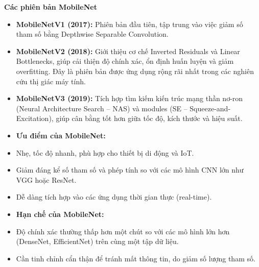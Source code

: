\documentclass[
]{article}
\begin{document}
\textbf{Các phiên bản MobileNet}

\begin{itemize}
\item
  \textbf{MobileNetV1 (2017):} Phiên bản đầu tiên, tập trung vào việc
  giảm số tham số bằng Depthwise Separable Convolution.
\item
  \textbf{MobileNetV2 (2018):} Giới thiệu cơ chế Inverted Residuals và
  Linear Bottlenecks, giúp cải thiện độ chính xác, ổn định huấn luyện và
  giảm overfitting. Đây là phiên bản được ứng dụng rộng rãi nhất trong
  các nghiên cứu thị giác máy tính.
\item
  \textbf{MobileNetV3 (2019):} Tích hợp tìm kiếm kiến trúc mạng thần
  nơ-ron (Neural Architecture Search -- NAS) và modules (SE --
  Squeeze-and-Excitation), giúp cân bằng tốt hơn giữa tốc độ, kích thước
  và hiệu suất.
\item
  \textbf{Ưu điểm của MobileNet:}
\end{itemize}

\begin{itemize}
\item
  Nhẹ, tốc độ nhanh, phù hợp cho thiết bị di động và IoT.
\item
  Giảm đáng kể số tham số và phép tính so với các mô hình CNN lớn như
  VGG hoặc ResNet.
\item
  Dễ dàng tích hợp vào các ứng dụng thời gian thực (real-time).
\end{itemize}

\begin{itemize}
\item
  \textbf{Hạn chế của MobileNet:}
\end{itemize}

\begin{itemize}
\item
  Độ chính xác thường thấp hơn một chút so với các mô hình lớn hơn
  (DenseNet, EfficientNet) trên cùng một tập dữ liệu.
\item
  Cần tinh chỉnh cẩn thận để tránh mất thông tin, do giảm số lượng tham
  số.
\end{itemize}
\end{document}
